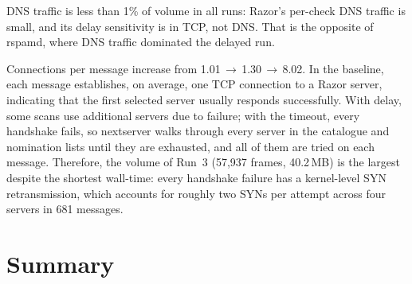 DNS traffic is less than 1\% of volume in all runs: Razor's per-check DNS traffic is
small, and its delay sensitivity is in TCP, not DNS. That is the opposite of rspamd, where DNS traffic dominated the delayed run.

Connections per message increase from 1.01\,$\to$\,1.30\,$\to$\,8.02. In the baseline, each message establishes, on average, one TCP connection to a Razor server, indicating that the first selected server usually responds successfully. With delay, some scans use additional servers due to failure; with the timeout, every handshake fails, so nextserver walks through every server in the catalogue and nomination lists until they are exhausted, and all of them are tried on each message. Therefore, the volume of Run~3 (57{,}937 frames, 40.2\,MB) is the largest despite the shortest wall-time: every handshake failure has a kernel-level SYN retransmission, which accounts for roughly two SYNs per attempt across four servers in 681 messages.


\section{Summary}

